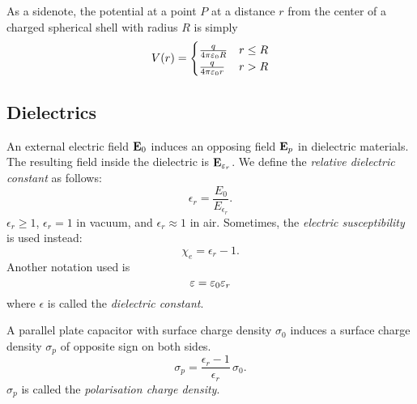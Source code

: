         As a sidenote, the potential at a point $P$ at a distance $r$ from the center of a charged spherical shell with radius $R$ is simply
        \begin{equation}
            V(r) = 
            \begin{cases}
                \frac{q}{4\pi\varepsilon_0 R} & r \leq R \\
                \frac{q}{4\pi\varepsilon_0 r} & r > R
            \end{cases}
        \end{equation}

\subsection{Dielectrics}    
    An external electric field $\mathbf{E}_0$ induces an opposing field $\mathbf{E}_p$ in dielectric materials. 
    The resulting field inside the dielectric is $\mathbf{E}_{\varepsilon_r}$. We define the \textit{relative dielectric constant} as follows: 
    \begin{equation}
        \epsilon_r = \frac{E_0}{E_{\epsilon_r}}.
    \end{equation}
    $\epsilon_r \geq 1$,  $\epsilon_r = 1$ in vacuum, and $\epsilon_r \approx 1$ in air.
    Sometimes, the \textit{electric susceptibility} is used instead:
    \begin{equation}
        \chi_e = \epsilon_r -1.
    \end{equation}
    Another notation used is 
    \begin{equation}
        \varepsilon = \varepsilon_0\varepsilon_r
    \end{equation}
    where $\epsilon$ is called the \textit{dielectric constant}.
    
    A parallel plate capacitor with surface charge density $\sigma_0$ induces a surface charge density $\sigma_p$ of opposite sign on both sides. 
    \begin{equation}
        \sigma_p = \frac{\epsilon_r -1}{\epsilon_r}\,\sigma_0.
    \end{equation}
    $\sigma_p$ is called the \textit{polarisation charge density}.
    
